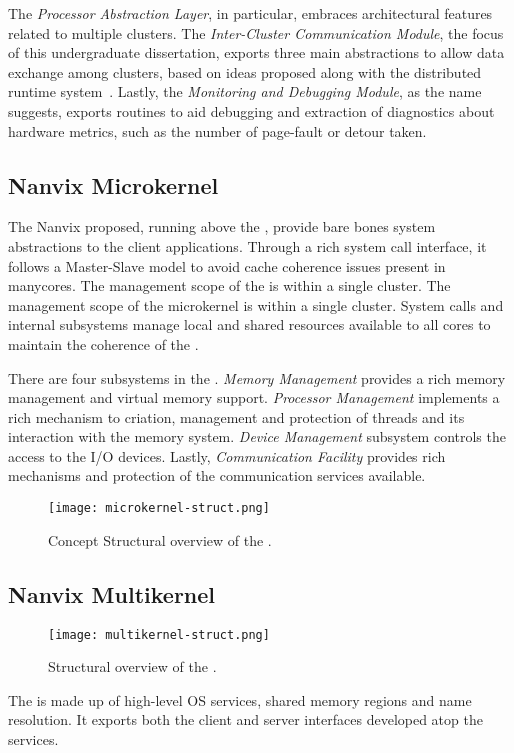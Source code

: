 		The \textit{Processor Abstraction Layer}, in particular, embraces
		architectural features related to multiple clusters.
		The \textit{Inter-Cluster Communication Module}, the focus of
		this undergraduate dissertation, exports three main abstractions
		to allow data exchange among clusters, based on ideas proposed
		along with the \nodeos distributed runtime system~\cite{DeDinechin2013-1}.
		Lastly, the \textit{Monitoring and Debugging Module}, as the
		name suggests, exports routines to aid debugging and extraction
		of diagnostics about hardware metrics, such as the number of
		page-fault or detour taken.

	\subsection{Nanvix Microkernel}
	\label{sec.microkernel}

		The Nanvix \microkernel proposed, running above the \hal, provide
		bare bones system abstractions to the client applications.
		Through a rich system call interface, it follows a Master-Slave \os model
		to avoid cache coherence issues present in manycores.
		The management scope of the \microkernel is within a single cluster.
		The management scope of the microkernel is within a single cluster.
		System calls and internal subsystems manage local and shared resources
		available to all cores to maintain the coherence of the \os.

		There are four subsystems in the \microkernel.
		\textit{Memory Management} provides a rich memory management and virtual
		memory support.
		\textit{Processor Management} implements a rich mechanism to criation,
		management and protection of threads and its interaction with the memory system.
		\textit{Device Management} subsystem controls the access to the I/O devices.
		Lastly, \textit{Communication Facility} provides rich mechanisms and protection of the
		communication services available.

		\begin{figure}[!tb]
			\centering%
			\caption{Concept Structural overview of the \microkernel.}%
			\label{fig:microkernel-struct}%
			\texttt{[image: microkernel-struct.png]}%
		\end{figure}
	
	\subsection{Nanvix Multikernel}
	\label{sec.multikernel}

		\begin{figure}[!tb]
			\centering%
			\caption{Structural overview of the \multikernel.}%
			\label{fig:microkernel-struct}%
			\texttt{[image: multikernel-struct.png]}%
		\end{figure}

		The \multikernel is made up of high-level OS services, \eg shared memory
		regions and name resolution.
		It exports both the client and server interfaces developed atop	the \microkernel services.